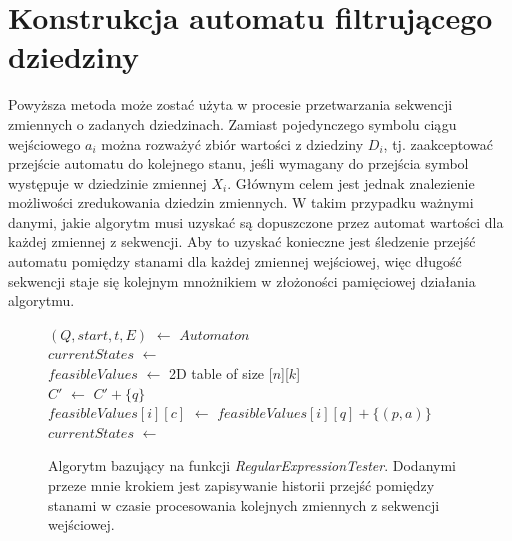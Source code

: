 \section{Konstrukcja automatu filtrującego dziedziny}
\par
Powyższa metoda może zostać użyta w procesie przetwarzania sekwencji zmiennych o zadanych dziedzinach. Zamiast pojedynczego
symbolu ciągu wejściowego $a_i$ można rozważyć zbiór wartości z dziedziny $D_i$, tj. zaakceptować przejście automatu do kolejnego
stanu, jeśli wymagany do przejścia symbol występuje w dziedzinie zmiennej $X_i$. Głównym celem jest jednak znalezienie możliwości
zredukowania dziedzin zmiennych. W takim przypadku ważnymi danymi, jakie algorytm musi uzyskać są dopuszczone przez automat
wartości dla każdej zmiennej z sekwencji. Aby to uzyskać konieczne jest śledzenie przejść automatu pomiędzy stanami
dla każdej zmiennej wejściowej, więc długość sekwencji staje się kolejnym mnożnikiem w złożoności pamięciowej działania
algorytmu.
\begin{figure}
	\centering
	{\small
		\begin{pseudokod}[H]
		{
			$(Q, start, {t}, E)$ $\leftarrow$ $Automaton$ \\
			$currentStates$ $\leftarrow$  \\
			$feasibleValues$ $\leftarrow$ 2D table of size [$n$][$k$] \\
			{
				{
					{
						$C'$ $\leftarrow$ $C' + \{q\}$ \\
						$feasibleValues[i][c]$ $\leftarrow$ $feasibleValues[i][q] + \{(p, a)\}$ \\
					}
				}
				$currentStates$ $\leftarrow$  \\
			}
		}
		\caption{Algorytm bazujący na funkcji \textit{RegularExpressionTester}. Dodanymi przeze mnie krokiem
				 jest zapisywanie historii przejść pomiędzy stanami w czasie procesowania kolejnych zmiennych
				 z sekwencji wejściowej.}
		\label{alg:evaluateAutomatonWithInputVars}
		\end{pseudokod}
	}
\end{figure}

